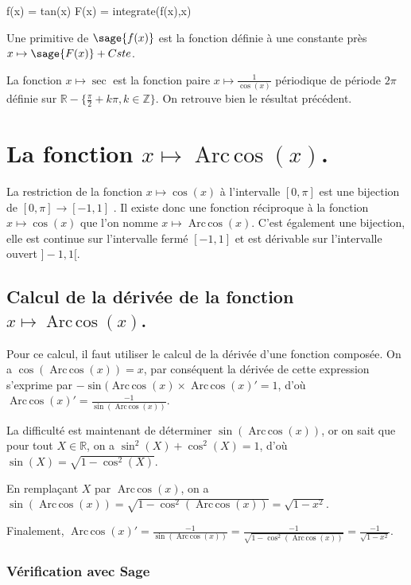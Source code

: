 \documentclass[a4paper,14pt]{extreport} %
\def\eclaire{\mathbb}
\def\R{\ensuremath{\eclaire R}}
\def\Z{\ensuremath{\eclaire Z}}
\renewcommand{\arccos}{\mathop{\mathrm{Arc\,cos}}}
\begin{document}
\begin{sageblock}
    f(x) = tan(x)
    F(x) = integrate(f(x),x)
\end{sageblock}

Une primitive de $\sage{f(x)}$ est la fonction définie à une constante près $x \mapsto \sage{F(x)} + Cste $.

La fonction $x\mapsto \sec$ est la fonction paire $x\mapsto \frac{1}{\cos(x)}$ périodique de période $2\pi$ définie sur $\R-\{ \frac{\pi}{2}+k\pi, k\in\Z\}$. On retrouve bien le résultat précédent.


\section{La fonction  $x \mapsto \arccos(x) $.}


La restriction de la fonction $x \mapsto \cos(x) $ à l'intervalle $[0,\pi]$ est une bijection de $[0,\pi] \rightarrow [-1,1]$ . Il existe donc une fonction réciproque à la fonction $x \mapsto \cos(x) $ que l'on nomme $x \mapsto \arccos(x) $. C'est également une bijection, elle est continue sur l'intervalle fermé  $ [-1,1]$ et est dérivable sur l'intervalle ouvert $]-1,1[$.

\subsection{Calcul de la dérivée de la fonction $x \mapsto \arccos(x) $.}

Pour ce calcul, il faut utiliser le calcul de la dérivée d'une fonction composée. On a $\cos(\arccos(x))=x$, par conséquent la dérivée de cette expression s'exprime par $ -\sin(\arccos(x) \times \arccos(x)' = 1$, d'où $\arccos(x)' = \frac{-1}{\sin(\arccos(x))} $.

La difficulté est maintenant de déterminer $\sin(\arccos(x))$, or on sait que pour tout $X \in \R$, on a $\sin^2(X) + \cos^2(X) = 1$, d'où $\sin(X) = \sqrt{1-\cos^2(X)}$.

En remplaçant $X$ par $\arccos(x)$, 
on a $\sin(\arccos(x)) = \sqrt{1-\cos^2(\arccos(x))} = \sqrt{1- x^2}$.

Finalement, $\arccos(x)' = \frac{-1}{\sin(\arccos(x))} = \frac{-1}{\sqrt{1-\cos^2(\arccos(x))}} =  \frac{-1}{\sqrt{1- x^2}} $.

\subsubsection*{Vérification avec Sage}
\end{document}

